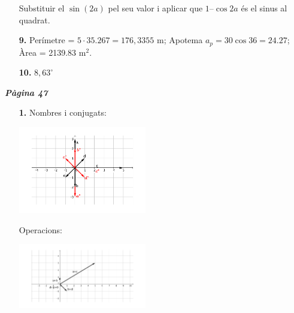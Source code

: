 \documentclass[a4paper, pdf, twoside]{book}
\begin{document}
\begin{multicols}{2}
\begin{enumerate}
Substituir el $\sin (2a)$ pel seu valor i aplicar que $1–\cos 2a$ és el sinus al quadrat.
\vspace{0.25cm}
\item[\fontfamily{phv}\selectfont\color{blue}\textbf{9. }]  \scalebox{0.6}{\simbolclau } 
Perímetre = $5 \cdot 35.267 = 176,3355$ m; Apotema $a_p = 30 \cos 36 =24.27$; \quad Àrea = 2139.83 m$^2$.
\vspace{0.25cm}
\item[\fontfamily{phv}\selectfont\color{blue}\textbf{10. }]  \scalebox{0.6}{\simbolclau } 
$8,63^\circ $
 \end{enumerate}
\vfill\null
\columnbreak
\def\currentname{Solucions del Tema 4}
\vspace*{0.75cm}

 

\vspace*{0.4cm}
 {}
\vspace{0.3cm}


{\textbf{\em Pàgina 47}} \hrulefill
\begin{enumerate}
\vspace{0.25cm}
\item[\fontfamily{phv}\selectfont\color{blue}\textbf{1. }] 
Nombres i conjugats:\par \includegraphics [width=0.44\textwidth ]{img-sol/t4-1a}\par Operacions:\par \includegraphics [width=0.44\textwidth ]{img-sol/t4-1b}
 \end{enumerate}
\vspace{0.3cm}


\end{multicols}
\end{document}

